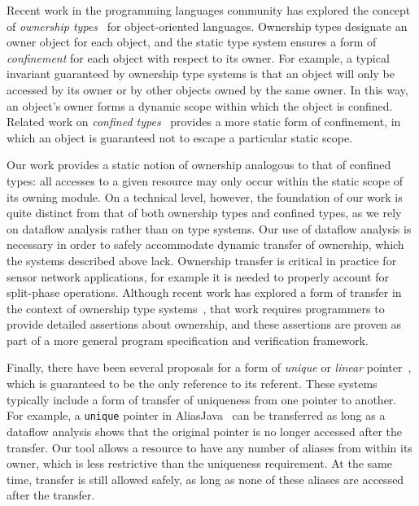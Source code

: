 Recent work in the programming languages community has explored the
concept of {\em ownership
types}~\cite{ownership,ownership2,BoyapatiEtAl02,aliasjava} for
object-oriented languages.  Ownership types designate an owner object
for each object, and the static type system ensures a form of {\em
confinement} for each object with respect to its owner.  For example,
a typical invariant guaranteed by ownership type systems is that an
object will only be accessed by its owner or by other objects owned by
the same owner.  In this way, an object's owner forms a dynamic scope
within which the object is confined.  Related work on {\em confined
types}~\cite{confined1,confined2} provides a more static form of
confinement, in which an object is guaranteed not to escape a
particular static scope.


Our work provides a static notion of ownership analogous to that of
confined types:  all accesses to a given resource may only occur
within the static scope of its owning module.  On a technical level,
however, the foundation of our work is quite distinct from that of
both ownership types and confined types, as we rely on dataflow
analysis rather than on type systems.  Our use of dataflow analysis is
necessary in order to safely accommodate dynamic transfer of
ownership, which the systems described above lack.  Ownership transfer
is critical in practice for sensor network applications, for example
it is needed 
to properly account for split-phase operations.  Although recent work
has explored a form of transfer in the context of ownership type
systems~\cite{DBLP:conf/ecoop/BanerjeeN05}, that work requires
programmers to provide detailed assertions about ownership, and these
assertions are proven as part of a more general program specification
and verification framework.


Finally, there have been several proposals for a form of {\em unique}
or {\em linear}
pointer~\cite{Boyland:2001:ABU,aliasjava,Wad90:linear,adoption-focus,Vault},
which is guaranteed to be the only reference to its referent.  These
systems typically include a form of transfer of uniqueness from one
pointer to another.  For example, a {\tt unique} pointer in
AliasJava~\cite{aliasjava} can be transferred as long as a dataflow
analysis shows that the original pointer is no longer accessed after
the transfer.  Our tool allows a resource to have any number of
aliases from within its owner, which is less restrictive than the
uniqueness requirement.  At the same time, transfer is still allowed
safely, as long as none of these aliases are accessed after the
transfer.

